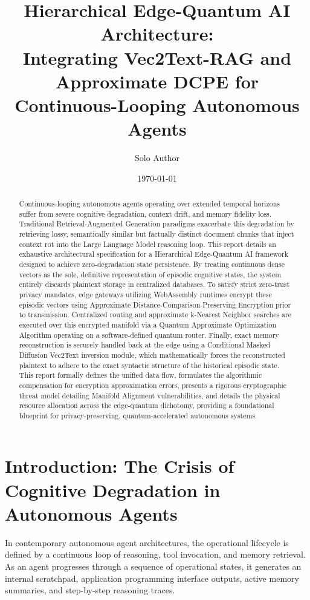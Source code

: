 \documentclass[12pt]{article}
\title{Hierarchical Edge-Quantum AI Architecture: \\
Integrating Vec2Text-RAG and Approximate DCPE for \\
Continuous-Looping Autonomous Agents}
\author{Solo Author}
\date{\today}
\begin{document}
\maketitle

\begin{abstract}
Continuous-looping autonomous agents operating over extended temporal horizons suffer from severe cognitive degradation, context drift, and memory fidelity loss. Traditional Retrieval-Augmented Generation paradigms exacerbate this degradation by retrieving lossy, semantically similar but factually distinct document chunks that inject context rot into the Large Language Model reasoning loop. This report details an exhaustive architectural specification for a Hierarchical Edge-Quantum AI framework designed to achieve zero-degradation state persistence. By treating continuous dense vectors as the sole, definitive representation of episodic cognitive states, the system entirely discards plaintext storage in centralized databases. To satisfy strict zero-trust privacy mandates, edge gateways utilizing WebAssembly runtimes encrypt these episodic vectors using Approximate Distance-Comparison-Preserving Encryption prior to transmission. Centralized routing and approximate k-Nearest Neighbor searches are executed over this encrypted manifold via a Quantum Approximate Optimization Algorithm operating on a software-defined quantum router. Finally, exact memory reconstruction is securely handled back at the edge using a Conditional Masked Diffusion Vec2Text inversion module, which mathematically forces the reconstructed plaintext to adhere to the exact syntactic structure of the historical episodic state. This report formally defines the unified data flow, formulates the algorithmic compensation for encryption approximation errors, presents a rigorous cryptographic threat model detailing Manifold Alignment vulnerabilities, and details the physical resource allocation across the edge-quantum dichotomy, providing a foundational blueprint for privacy-preserving, quantum-accelerated autonomous systems.
\end{abstract}

\section{Introduction: The Crisis of Cognitive Degradation in Autonomous Agents}

In contemporary autonomous agent architectures, the operational lifecycle is defined by a continuous loop of reasoning, tool invocation, and memory retrieval. As an agent progresses through a sequence of operational states, it generates an internal scratchpad, application programming interface outputs, active memory summaries, and step-by-step reasoning traces.
\end{document}

